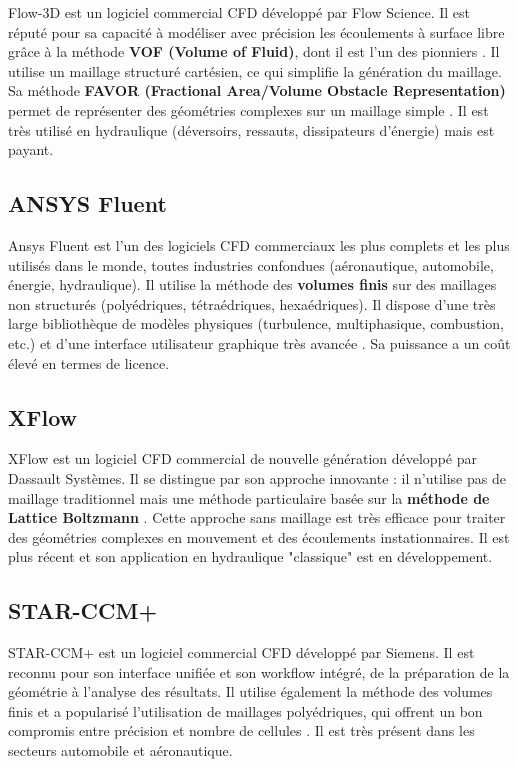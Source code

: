 Flow-3D est un logiciel commercial CFD développé par Flow Science. Il est réputé pour sa capacité à modéliser avec précision les écoulements à surface libre grâce à la méthode \textbf{VOF (Volume of Fluid)}, dont il est l'un des pionniers \cite{hirt1981volume}. Il utilise un maillage structuré cartésien, ce qui simplifie la génération du maillage. Sa méthode \textbf{FAVOR (Fractional Area/Volume Obstacle Representation)} permet de représenter des géométries complexes sur un maillage simple \cite{flow2016user}. Il est très utilisé en hydraulique (déversoirs, ressauts, dissipateurs d'énergie) mais est payant.

\subsection{ANSYS Fluent}
\label{subsec:ansys_fluent}

Ansys Fluent est l'un des logiciels CFD commerciaux les plus complets et les plus utilisés dans le monde, toutes industries confondues (aéronautique, automobile, énergie, hydraulique). Il utilise la méthode des \textbf{volumes finis} sur des maillages non structurés (polyédriques, tétraédriques, hexaédriques). Il dispose d'une très large bibliothèque de modèles physiques (turbulence, multiphasique, combustion, etc.) et d'une interface utilisateur graphique très avancée \cite{ansys2020fluent, matsson2022introduction}. Sa puissance a un coût élevé en termes de licence.

\subsection{XFlow}
\label{subsec:xflow}

XFlow est un logiciel CFD commercial de nouvelle génération développé par Dassault Systèmes. Il se distingue par son approche innovante : il n'utilise pas de maillage traditionnel mais une méthode particulaire basée sur la \textbf{méthode de Lattice Boltzmann} \cite{chen1998lattice, kruger2017lattice}. Cette approche sans maillage est très efficace pour traiter des géométries complexes en mouvement et des écoulements instationnaires. Il est plus récent et son application en hydraulique "classique" est en développement.

\subsection{STAR-CCM+}
\label{subsec:starccm}

STAR-CCM+ est un logiciel commercial CFD développé par Siemens. Il est reconnu pour son interface unifiée et son workflow intégré, de la préparation de la géométrie à l'analyse des résultats. Il utilise également la méthode des volumes finis et a popularisé l'utilisation de maillages polyédriques, qui offrent un bon compromis entre précision et nombre de cellules \cite{cd2019star, peric2005advantage}. Il est très présent dans les secteurs automobile et aéronautique.

